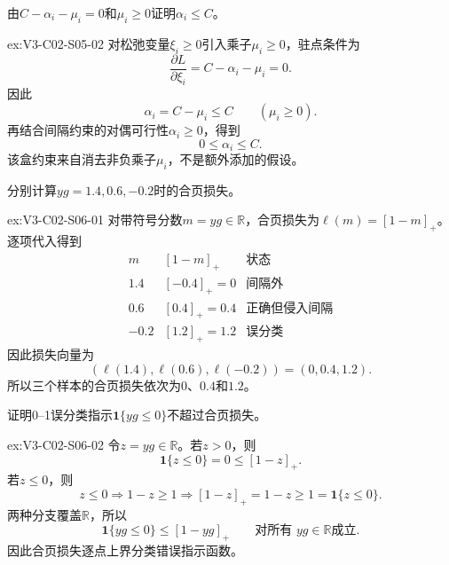 \begin{SLChapterExercisePairSection}
\begin{exercise}\label{ex:V3-C02-S05-02}
由$C-\alpha_i-\mu_i=0$和$\mu_i\geq0$证明$\alpha_i\leq C$。
\end{exercise}
\ifSLFullEdition
{}\label{sol:V3-C02-S05-02}
\begin{chapterexercisesolution}{ex:V3-C02-S05-02}
对松弛变量$\xi_i\geq0$引入乘子$\mu_i\geq0$，驻点条件为
\[
\frac{\partial L}{\partial\xi_i}=C-\alpha_i-\mu_i=0.
\]
因此
\[
\alpha_i=C-\mu_i
\leq C
\qquad(\mu_i\geq0).
\]
再结合间隔约束的对偶可行性$\alpha_i\geq0$，得到
\[
0\leq\alpha_i\leq C.
\]
该盒约束来自消去非负乘子$\mu_i$，不是额外添加的假设。
\end{chapterexercisesolution}
\fi

\begin{exercise}\label{ex:V3-C02-S06-01}
分别计算$yg=1.4,0.6,-0.2$时的合页损失。
\end{exercise}
\ifSLFullEdition
{}\label{sol:V3-C02-S06-01}
\begin{chapterexercisesolution}{ex:V3-C02-S06-01}
对带符号分数$m=yg\in\mathbb R$，合页损失为$\ell(m)=[1-m]_+$。逐项代入得到
\[
\begin{array}{c|c|c}
m&[1-m]_+&\text{状态}\\ \hline
1.4&[{-0.4}]_+=0&\text{间隔外}\\
0.6&[0.4]_+=0.4&\text{正确但侵入间隔}\\
-0.2&[1.2]_+=1.2&\text{误分类}
\end{array}
\]
因此损失向量为
\[
(\ell(1.4),\ell(0.6),\ell(-0.2))=(0,0.4,1.2).
\]
所以三个样本的合页损失依次为$0$、$0.4$和$1.2$。
\end{chapterexercisesolution}
\fi

\begin{exercise}\label{ex:V3-C02-S06-02}
证明0--1误分类指示$\mathbf1\{yg\leq0\}$不超过合页损失。
\end{exercise}
\ifSLFullEdition
{}\label{sol:V3-C02-S06-02}
\begin{chapterexercisesolution}{ex:V3-C02-S06-02}
令$z=yg\in\mathbb R$。若$z>0$，则
\[
\mathbf1\{z\leq0\}=0\leq[1-z]_+.
\]
若$z\leq0$，则
\[
z\leq0
\Longrightarrow 1-z\geq1
\Longrightarrow [1-z]_+=1-z\geq1
=\mathbf1\{z\leq0\}.
\]
两种分支覆盖$\mathbb R$，所以
\[
\mathbf1\{yg\leq0\}\leq[1-yg]_+
\qquad\text{对所有 }yg\in\mathbb R\text{成立}.
\]
因此合页损失逐点上界分类错误指示函数。
\end{chapterexercisesolution}
\fi


\end{SLChapterExercisePairSection}

